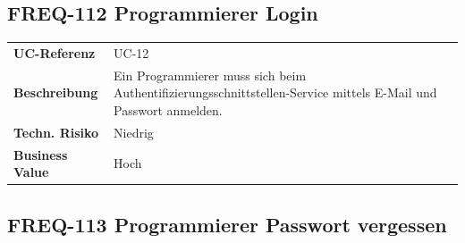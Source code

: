 \subsection{FREQ-112 Programmierer
Login}\label{freq-112-programmierer-login}

\begin{longtable}[c]{@{}ll@{}}
\toprule
\begin{minipage}[t]{0.20\columnwidth}\raggedright\strut
\textbf{UC-Referenz}
\strut\end{minipage} &
\begin{minipage}[t]{0.74\columnwidth}\raggedright\strut
UC-12
\strut\end{minipage}\tabularnewline
\begin{minipage}[t]{0.20\columnwidth}\raggedright\strut
\textbf{Beschreibung}
\strut\end{minipage} &
\begin{minipage}[t]{0.74\columnwidth}\raggedright\strut
Ein Programmierer muss sich beim
Authentifizierungsschnittstellen-Service mittels E-Mail und Passwort
anmelden.
\strut\end{minipage}\tabularnewline
\begin{minipage}[t]{0.20\columnwidth}\raggedright\strut
\textbf{Techn. Risiko}
\strut\end{minipage} &
\begin{minipage}[t]{0.74\columnwidth}\raggedright\strut
Niedrig
\strut\end{minipage}\tabularnewline
\begin{minipage}[t]{0.20\columnwidth}\raggedright\strut
\textbf{Business Value}
\strut\end{minipage} &
\begin{minipage}[t]{0.74\columnwidth}\raggedright\strut
Hoch
\strut\end{minipage}\tabularnewline
\bottomrule
\end{longtable}

\subsection{FREQ-113 Programmierer Passwort
vergessen}\label{freq-113-programmierer-passwort-vergessen}


